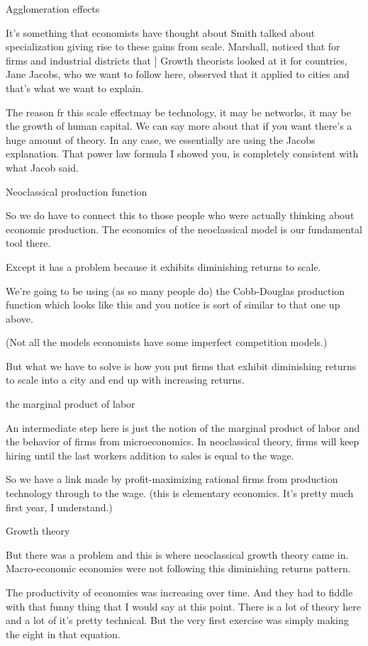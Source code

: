 	Agglomeration effects
 
It's something that economists have thought about Smith talked about specialization giving rise to these gains from scale. 
Marshall, noticed that for firms and industrial districts that ]
Growth  theorists looked at it for countries, 
Jane Jacobs, who we want to follow here,  observed that it applied to cities and that's what we want to explain.


The reason fr this scale effectmay be technology, it may be networks, it may be the growth of human capital. We can say more about that if you want there's a huge amount of theory. In any case, we essentially are using the Jacobs explanation. That power law formula I showed you, is completely consistent with what Jacob said.

Neoclassical production function

So we do have to connect this to those people who were actually thinking about economic production. The economics of the neoclassical model is our fundamental tool there. 

Except it has a problem because it exhibits diminishing returns to scale.

We're going to be using (as so many people do) the Cobb-Douglas production function which looks like this and you notice is sort of similar to that one up above.

(Not all the models economists have some imperfect competition models.) 

But what we have to solve is how you put firms that exhibit diminishing returns to scale into a city and end up with increasing returns.

the marginal product of labor

An intermediate step here is just the notion of the marginal product of labor and the behavior of firms from microeconomics. In neoclassical theory, firms will keep hiring until the last workers addition to sales is equal to the  wage. 

So we have a link made by  profit-maximizing rational  firms 
from production technology through to the  wage. (this is elementary economics. It's pretty much first year, I understand.)


Growth theory

But there was a problem and this is where neoclassical growth theory came in. Macro-economic economies were not following this diminishing returns pattern. 

The productivity of economies was increasing over time. And they had to fiddle with that funny thing that I would say at this point. There is a lot of theory here and a lot of it's pretty technical. But the very first exercise was simply making the eight in that equation.

